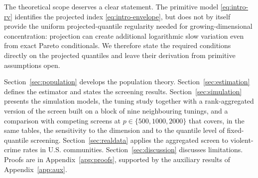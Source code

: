 The theoretical scope deserves a clear statement. The primitive model
\eqref{eq:intro-rv} identifies the projected index
\eqref{eq:intro-envelope}, but does not by itself provide the uniform
projected-quantile regularity needed for growing-dimensional concentration:
projection can create additional logarithmic slow variation even from exact
Pareto conditionals. We therefore state the required conditions directly on
the projected quantiles and leave their derivation from primitive
assumptions open.

Section~\ref{sec:population} develops the population theory.
Section~\ref{sec:estimation} defines the estimator and states the screening
results. Section~\ref{sec:simulation} presents the simulation models, the tuning
study together with a rank-aggregated version of the screen built on a
block of nine neighbouring tunings, and a comparison with competing
screens at $p\in\{500,1000,2000\}$ that covers, in the same tables, the
sensitivity to the dimension and to the quantile level of fixed-quantile
screening. Section~\ref{sec:realdata} applies the aggregated screen to
violent-crime rates in U.S. communities.
Section~\ref{sec:discussion} discusses limitations. Proofs are in
Appendix~\ref{app:proofs}, supported by the auxiliary results of
Appendix~\ref{app:aux}.
